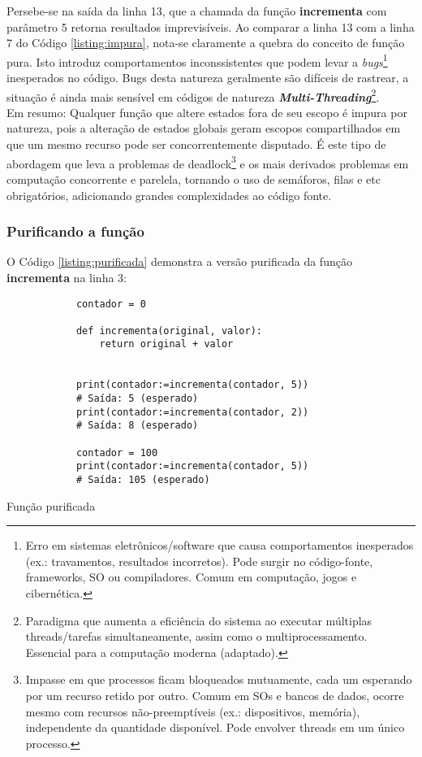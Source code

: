 \documentclass[date,twocolumn,a4paper]{ppgem}
\begin{document}
        Persebe-se na saída da linha 13, que a chamada da função \textbf{incrementa} com parâmetro 5 retorna resultados imprevisíveis. Ao comparar
        a linha 13 com a linha 7 do Código \ref{listing:impura}, nota-se claramente a quebra do conceito de função pura. Isto introduz comportamentos inconssistentes
        que podem levar a \textit{bugs}\footnote{
            Erro em sistemas eletrônicos/software que causa comportamentos inesperados (ex.: travamentos, resultados incorretos). Pode surgir no código-fonte, frameworks, SO ou compiladores. Comum em computação, jogos e cibernética\cite{wiki_bug}.
        } inesperados no código. Bugs desta natureza geralmente são difíceis de rastrear, a situação é ainda
        mais sensível em códigos de natureza \textit{\textbf{Multi-Threading}}\footnote{
            Paradigma que aumenta a eficiência do sistema ao executar múltiplas threads/tarefas simultaneamente, assim como o multiprocessamento. Essencial para a computação moderna\cite{wiki_multithreading} (adaptado).
        }.\\
        Em resumo: Qualquer função que altere estados fora de seu escopo é impura por natureza, pois a alteração de estados globais geram escopos compartilhados em que um mesmo recurso pode ser concorrentemente disputado.
        É este tipo de abordagem que leva a problemas de deadlock\footnote{
            Impasse em que processos ficam bloqueados mutuamente, cada um esperando por um recurso retido por outro. Comum em SOs e bancos de dados, ocorre mesmo com recursos não-preemptíveis (ex.: dispositivos, memória), independente da quantidade disponível. Pode envolver threads em um único processo\cite{wiki_deadlock}.
        } e os mais derivados problemas em computação concorrente e parelela, tornando o uso de semáforos, filas e etc obrigatórios, adicionando grandes complexidades ao código fonte.

    \subsubsection{Purificando a função}
    O Código \ref{listing:purificada} demonstra a versão purificada da função \textbf{incrementa} na linha 3:
    \begin{listing}[!ht]
        \begin{verbatim}
            contador = 0

            def incrementa(original, valor):
                return original + valor


            print(contador:=incrementa(contador, 5))
            # Saída: 5 (esperado)
            print(contador:=incrementa(contador, 2))
            # Saída: 8 (esperado)

            contador = 100
            print(contador:=incrementa(contador, 5))
            # Saída: 105 (esperado)
        \end{verbatim}
        \caption{Função purificada}
        \label{listing:purificada}
    \end{listing}\linebreak
\end{document}
